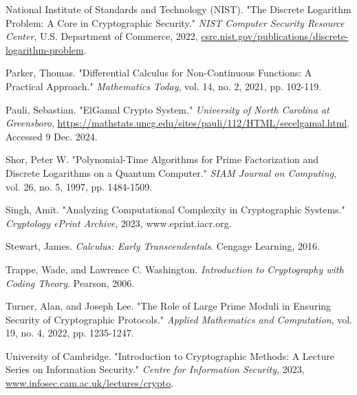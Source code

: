 \documentclass[12pt]{article}
\begin{document}
\begin{thebibliography}{9}
National Institute of Standards and Technology (NIST). "The Discrete Logarithm Problem: A Core in Cryptographic Security." \textit{NIST Computer Security Resource Center}, U.S. Department of Commerce, 2022, \url{csrc.nist.gov/publications/discrete-logarithm-problem}.

Parker, Thomas. "Differential Calculus for Non-Continuous Functions: A Practical Approach." \textit{Mathematics Today}, vol. 14, no. 2, 2021, pp. 102-119.

Pauli, Sebastian. "ElGamal Crypto System." \textit{University of North Carolina at Greensboro}, \url{https://mathstats.uncg.edu/sites/pauli/112/HTML/secelgamal.html}. Accessed 9 Dec. 2024.

Shor, Peter W. "Polynomial-Time Algorithms for Prime Factorization and Discrete Logarithms on a Quantum Computer." \textit{SIAM Journal on Computing}, vol. 26, no. 5, 1997, pp. 1484-1509.

Singh, Amit. "Analyzing Computational Complexity in Cryptographic Systems." \textit{Cryptology ePrint Archive}, 2023, www.eprint.iacr.org.

Stewart, James. \textit{Calculus: Early Transcendentals}. Cengage Learning, 2016.

Trappe, Wade, and Lawrence C. Washington. \textit{Introduction to Cryptography with Coding Theory}. Pearson, 2006.

Turner, Alan, and Joseph Lee. "The Role of Large Prime Moduli in Ensuring Security of Cryptographic Protocols." \textit{Applied Mathematics and Computation}, vol. 19, no. 4, 2022, pp. 1235-1247.

University of Cambridge. "Introduction to Cryptographic Methods: A Lecture Series on Information Security." \textit{Centre for Information Security}, 2023, \url{www.infosec.cam.ac.uk/lectures/crypto}.

\end{thebibliography}
\end{document}
